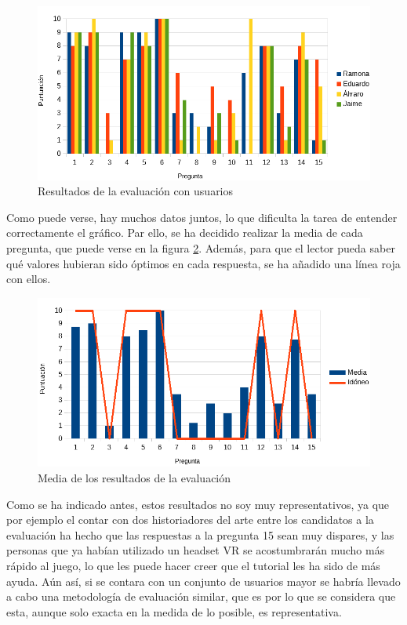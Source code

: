 \begin{figure}[!h]
\begin{center}
\includegraphics[width=1\textwidth]{imagenes/7/resultados/resultados-eval.png}
\caption{Resultados de la evaluación con usuarios}
\label{fig:resultados-eval}
\end{center}
\end{figure}

Como puede verse, hay muchos datos juntos, lo que dificulta la tarea de entender correctamente el gráfico. Par ello, se ha decidido realizar la media de cada pregunta, que puede verse en la figura \ref{fig:resultados-media}. Además, para que el lector pueda saber qué valores hubieran sido óptimos en cada respuesta, se ha añadido una línea roja con ellos. 

\begin{figure}[!h]
\begin{center}
\includegraphics[width=1\textwidth]{imagenes/7/resultados/resultados-media.png}
\caption{Media de los resultados de la evaluación}
\label{fig:resultados-media}
\end{center}
\end{figure}

Como se ha indicado antes, estos resultados no soy muy representativos, ya que por ejemplo el contar con dos historiadores del arte entre los candidatos a la evaluación ha hecho que las respuestas a la pregunta 15 sean muy dispares, y las personas que ya habían utilizado un headset \acs{VR} se acostumbrarán mucho más rápido al juego, lo que les puede hacer creer que el tutorial les ha sido de más ayuda. Aún así, si se contara con un conjunto de usuarios mayor se habría llevado a cabo una metodología de evaluación similar, que es por lo que se considera que esta, aunque solo exacta en la medida de lo posible, es representativa.

